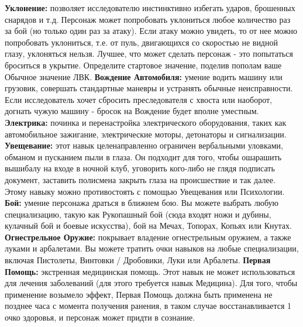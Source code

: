 \documentclass[letterpaper,twocolumn,openany, twoside, 11pt, usenames]{cocbook}
\begin{document}
\begin{fullcocpaperbox}{}{}
  \begin{multicols}{3}
  \textbf{Уклонение:} позволяет исследователю инстинктивно избегать ударов, брошенных снарядов и т.д. Персонаж может попробовать уклониться любое количество раз за бой (но только один раз за атаку). Если атаку можно увидеть, то от нее можно попробовать уклониться, т.е. от пуль, двигающихся со скоростью не видной глазу, уклоняться нельзя. Лучшее, что может сделать персонаж - это попытаться броситься в укрытие. Определите стартовое значение, поделив пополам ваше Обычное значение ЛВК.
  \smallbreak
  \textbf{Вождение Автомобиля:} умение водить машину или грузовик, совершать стандартные маневры и устранять обычные неисправности. Если исследователь хочет сбросить преследователя с хвоста или наоборот, догнать чужую машину - бросок на Вождение будет вполне уместным.
  \smallbreak
  \textbf{Электрика:} починка и перенастройка электрического оборудования, таких как автомобильное зажигание, электрические моторы, детонаторы и сигнализации.
  \smallbreak
  \textbf{Увещевание:} этот навык целенаправленно ограничен вербальными уловками, обманом и пусканием пыли в глаза. Он подходит для того, чтобы ошарашить вышибалу на входе в ночной клуб, уговорить кого-либо не глядя подписать документ, заставить полисмена закрыть глаза на происшествие и так далее. Этому навыку можно противостоять с помощью Увещевания или Психологии. 
  \smallbreak
  \textbf{Бой:} умение персонажа драться в ближнем бою. Вы можете выбрать любую специализацию, такую как Рукопашный бой (сюда входят ножи и дубины, кулачный бой и боевые искусства), бой на Мечах, Топорах, Копьях или Кнутах.
  \smallbreak
  \textbf{Огнестрельное Оружие:} покрывает владение огнестрельным оружием, а также луками и арбалетами. Вы можете тратить очки навыков на любые специализации, включая Пистолеты, Винтовки / Дробовики, Луки или Арбалеты.
  \smallbreak
  \textbf{Первая Помощь:} экстренная медицинская помощь. Этот навык не может использоваться для лечения заболеваний (для этого требуется навык Медицина). Для того, чтобы применение возымело эффект, Первая Помощь должна быть применена не позднее часа с момента получения ранения, в таком случае восстанавливается 1 очко здоровья, и персонаж может придти в сознание.

\end{multicols}
\end{fullcocpaperbox}
\end{document}
